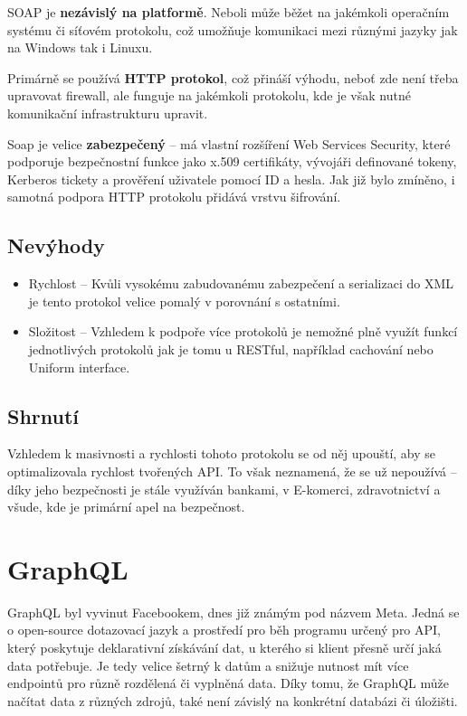 SOAP je \textbf{nezávislý na platformě}. Neboli může běžet na jakémkoli operačním systému či síťovém protokolu, což umožňuje komunikaci mezi různými jazyky jak na Windows tak i Linuxu.

Primárně se používá \textbf{HTTP protokol}, což přináší výhodu, neboť zde není třeba upravovat firewall, ale funguje na jakémkoli protokolu, kde je však nutné komunikační infrastrukturu upravit.

Soap je velice \textbf{zabezpečený} -- má vlastní rozšíření Web Services Security, které podporuje bezpečnostní funkce jako x.509 certifikáty, vývojáři definované tokeny, Kerberos tickety a prověření uživatele pomocí ID a hesla. Jak již bylo zmíněno, i samotná podpora HTTP protokolu přidává vrstvu šifrování.

\subsection{Nevýhody}
\begin{itemize}
    \item Rychlost -- Kvůli vysokému zabudovanému zabezpečení a serializaci do XML je tento protokol velice pomalý v porovnání s ostatními.
    \item Složitost -- Vzhledem k podpoře více protokolů je nemožné plně využít funkcí jednotlivých protokolů jak je tomu u RESTful, například cachování nebo Uniform interface.
\end{itemize}


\subsection{Shrnutí}
Vzhledem k masivnosti a rychlosti tohoto protokolu se od něj upouští, aby se optimalizovala rychlost tvořených API. To však neznamená, že se už nepoužívá -- díky jeho bezpečnosti je stále využíván bankami, v E-komerci, zdravotnictví a všude, kde je primární apel na bezpečnost. \cite{soap}\cite{enwiki:1192016676}


\section{GraphQL}
GraphQL byl vyvinut Facebookem, dnes již známým pod názvem Meta. Jedná se o open-source dotazovací jazyk a prostředí pro běh programu určený pro API, který poskytuje deklarativní získávání dat, u kterého si klient přesně určí jaká data potřebuje. Je tedy velice šetrný k datům a snižuje nutnost mít více endpointů pro různě rozdělená či vyplněná data. Díky tomu, že GraphQL může načítat data z různých zdrojů, také není závislý na konkrétní databázi či úložišti.



